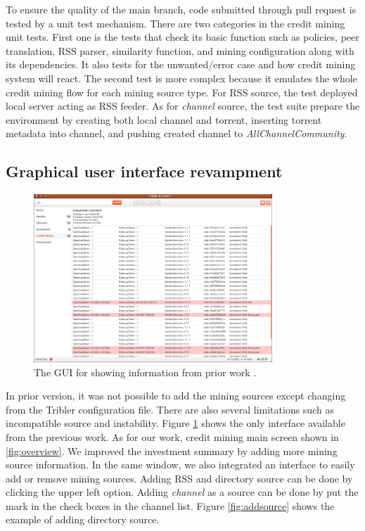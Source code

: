 To ensure the quality of the main branch, code submitted through pull request is tested by a unit test mechanism. There are two categories in the credit mining unit tests. First one is the tests that check its basic function such as policies, peer translation, RSS parser, similarity function, and mining configuration along with its dependencies. It also tests for the unwanted/error case and how credit mining system will react. The second test is more complex because it emulates the whole credit mining flow for each mining source type. For RSS source, the test deployed local server acting as RSS feeder. As for \textit{channel} source, the test suite prepare the environment by creating both local channel and torrent, inserting torrent metadata into channel, and pushing created channel to \textit{AllChannelCommunity}. 

\subsection{Graphical user interface revampment}
\begin{figure}[h]
	\centering
	\includegraphics[width=0.8\textwidth]{pics/old_cm.png}
	\caption{The GUI for showing information from prior work \cite{2015:creditmining:capota}.}
	\label{fig:oldcm}
\end{figure}
In prior version, it was not possible to add the mining sources except changing from the Tribler configuration file. There are also several limitations such as incompatible source and instability. Figure \ref{fig:oldcm} shows the only interface available from the previous work. As for our work, credit mining main screen shown in \ref{fig:overview}. We improved the investment summary by adding more mining source information. In the same window, we also integrated an interface to easily add or remove mining sources. Adding RSS and directory source can be done by clicking the upper left option. Adding \textit{channel} as a source can be done by put the mark in the check boxes in the channel list. Figure \ref{fig:addsource} shows the example of adding directory source. 

